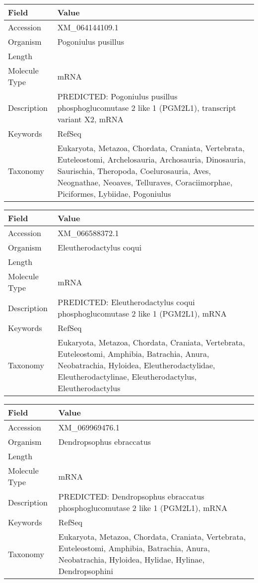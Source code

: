 \documentclass[10pt]{article}
\begin{document}
{\footnotesize
\begin{longtable}{>{\raggedright\arraybackslash}p{4.5cm} >{\raggedright\arraybackslash}p{11.5cm}}
\textbf{Field} & \textbf{Value} \\
\hline
Accession & XM\_064144109.1 \\
Organism & Pogoniulus pusillus \\
Length & 2902 \\
Molecule Type & mRNA \\
Description & PREDICTED: Pogoniulus pusillus phosphoglucomutase 2 like 1 (PGM2L1), transcript variant X2, mRNA \\
Keywords & RefSeq \\
Taxonomy & Eukaryota, Metazoa, Chordata, Craniata, Vertebrata, Euteleostomi, Archelosauria, Archosauria, Dinosauria, Saurischia, Theropoda, Coelurosauria, Aves, Neognathae, Neoaves, Telluraves, Coraciimorphae, Piciformes, Lybiidae, Pogoniulus \\
\end{longtable}
}

{\footnotesize
\begin{longtable}{>{\raggedright\arraybackslash}p{4.5cm} >{\raggedright\arraybackslash}p{11.5cm}}
\textbf{Field} & \textbf{Value} \\
\hline
Accession & XM\_066588372.1 \\
Organism & Eleutherodactylus coqui \\
Length & 3696 \\
Molecule Type & mRNA \\
Description & PREDICTED: Eleutherodactylus coqui phosphoglucomutase 2 like 1 (PGM2L1), mRNA \\
Keywords & RefSeq \\
Taxonomy & Eukaryota, Metazoa, Chordata, Craniata, Vertebrata, Euteleostomi, Amphibia, Batrachia, Anura, Neobatrachia, Hyloidea, Eleutherodactylidae, Eleutherodactylinae, Eleutherodactylus, Eleutherodactylus \\
\end{longtable}
}

{\footnotesize
\begin{longtable}{>{\raggedright\arraybackslash}p{4.5cm} >{\raggedright\arraybackslash}p{11.5cm}}
\textbf{Field} & \textbf{Value} \\
\hline
Accession & XM\_069969476.1 \\
Organism & Dendropsophus ebraccatus \\
Length & 2752 \\
Molecule Type & mRNA \\
Description & PREDICTED: Dendropsophus ebraccatus phosphoglucomutase 2 like 1 (PGM2L1), mRNA \\
Keywords & RefSeq \\
Taxonomy & Eukaryota, Metazoa, Chordata, Craniata, Vertebrata, Euteleostomi, Amphibia, Batrachia, Anura, Neobatrachia, Hyloidea, Hylidae, Hylinae, Dendropsophini \\
\end{longtable}
}
\end{document}
